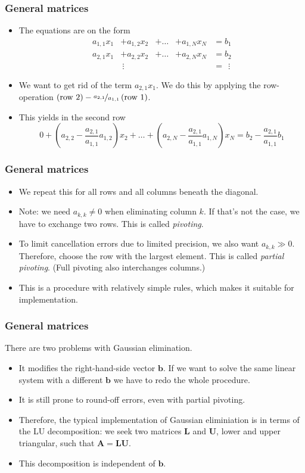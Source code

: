 \begin{frame}
  \frametitle{General matrices}
  \begin{itemize}
  \item The equations are on the form
    \[
      \begin{aligned}
        a_{1,1}x_1 &+ a_{1,2}x_2 &+ \ldots & +a_{1,N}x_N &= b_1 \\
        a_{2,1}x_1 &+ a_{2,2}x_2 &+ \ldots & +a_{2,N}x_N &= b_2 \\
        &\ \vdots  & & &=\ \ \vdots
      \end{aligned}
    \]
  \item We want to get rid of the term $a_{2,1}x_1$. We do this by applying the
    row-operation
    $\left(\text{row 2}\right)-\nicefrac{a_{2,1}}{a_{1,1}}\left(\text{row 1}\right)$.
  \item This yields in the second row
    \[
      0 + \left( a_{2,2} - \frac{a_{2,1}}{a_{1,1}} a_{1,2} \right) x_2 + \ldots
      + \left( a_{2,N} - \frac{a_{2,1}}{a_{1,1}}a_{1,N} \right) x_N
      = b_2 - \frac{a_{2,1}}{a_{1,1}} b_1
    \]
  \end{itemize}
\end{frame}

\begin{frame}
  \frametitle{General matrices}
  \begin{itemize}
  \item We repeat this for all rows and all columns beneath the diagonal.
  \item Note: we need $a_{k,k} \not= 0$ when eliminating column $k$. If that's
    not the case, we have to exchange two rows. This is called \emph{pivoting}.
  \item To limit cancellation errors due to limited precision, we also want
    $a_{k,k} \gg 0$. Therefore, choose the row with the largest element. This is
    called \emph{partial pivoting}. (Full pivoting also interchanges columns.)
  \item This is a procedure with relatively simple rules, which makes it
    suitable for implementation.
  \end{itemize}
\end{frame}

\begin{frame}
  \frametitle{General matrices}
  There are two problems with Gaussian elimination.
  \begin{itemize}
  \item It modifies the right-hand-side vector $\bm b$. If we want to solve the
    same linear system with a different $\bm b$ we have to redo the whole
    procedure.
  \item It is still prone to round-off errors, even with partial pivoting.
  \item Therefore, the typical implementation of Gaussian eliminiation is in
    terms of the LU decomposition: we seek two matrices $\bm L$ and $\bm U$,
    lower and upper triangular, such that $\bm A = \bm L \bm U$.
  \item This decomposition is independent of $\bm b$.
  \end{itemize}
\end{frame}

